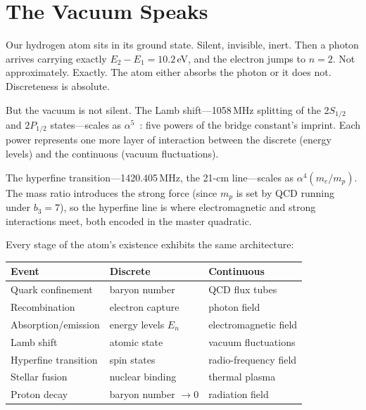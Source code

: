 \documentclass[12pt]{article}
\theoremstyle{compact}
\begin{document}
\section{The Vacuum Speaks}
\label{sec:vacuum}

Our hydrogen atom sits in its ground state. Silent, invisible, inert. Then a photon arrives carrying exactly $E_2 - E_1 = 10.2$\,eV, and the electron jumps to $n = 2$. Not approximately. Exactly. The atom either absorbs the photon or it does not. Discreteness is absolute.

But the vacuum is not silent. The Lamb shift---1058\,MHz splitting of the $2S_{1/2}$ and $2P_{1/2}$ states---scales as $\alpha^5$~\cite{lamb}: five powers of the bridge constant's imprint. Each power represents one more layer of interaction between the discrete (energy levels) and the continuous (vacuum fluctuations).

The hyperfine transition---1420.405\,MHz, the 21-cm line---scales as $\alpha^4(m_e/m_p)$. The mass ratio introduces the strong force (since $m_p$ is set by QCD running under $b_3 = 7$), so the hyperfine line is where electromagnetic and strong interactions meet, both encoded in the master quadratic.

Every stage of the atom's existence exhibits the same architecture:

\begin{center}
\begin{tabular}{lll}
\toprule
\textbf{Event} & \textbf{Discrete} & \textbf{Continuous} \\
\midrule
Quark confinement & baryon number & QCD flux tubes \\
Recombination & electron capture & photon field \\
Absorption/emission & energy levels $E_n$ & electromagnetic field \\
Lamb shift & atomic state & vacuum fluctuations \\
Hyperfine transition & spin states & radio-frequency field \\
Stellar fusion & nuclear binding & thermal plasma \\
Proton decay & baryon number $\to 0$ & radiation field \\
\bottomrule
\end{tabular}
\end{center}
\end{document}
